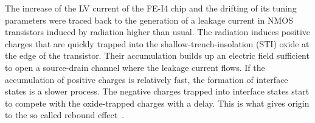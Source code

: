 The increase of the LV current  of the FE-I4 chip and the drifting of its tuning parameters were traced back to the generation of a leakage current in NMOS transistors induced by radiation higher than usual. The radiation induces positive charges that are quickly trapped into the shallow-trench-insolation (STI) oxide at the edge of the transistor. Their accumulation builds up an electric field sufficient to open a source-drain channel where the leakage current flows. If the accumulation of positive charges is relatively fast, the formation of interface states is a slower process. The negative charges trapped into interface states start to compete with the oxide-trapped charges with a delay. This is what gives origin to the so called rebound effect~\cite{FACCIO}. 


